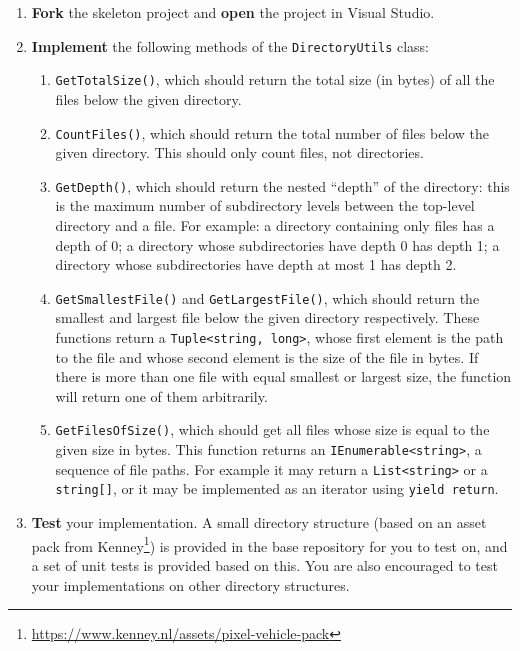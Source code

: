 \documentclass{../../../fal_assignment}
\begin{document}
\begin{enumerate}[label=(\alph*)]
	\item \textbf{Fork} the skeleton project and \textbf{open} the project in Visual Studio.
	\item \textbf{Implement} the following methods of the \lstinline{DirectoryUtils} class:
		\begin{enumerate}[label=(\roman*)]
			\item \lstinline{GetTotalSize()}, which should return the total size (in bytes) of all the files
				below the given directory.
			\item \lstinline{CountFiles()}, which should return the total number of files
				below the given directory. This should only count files, not directories.
			\item \lstinline{GetDepth()}, which should return the nested ``depth'' of the directory:
				this is the maximum number of subdirectory levels between the top-level directory
				and a file.
				For example: a directory containing only files has a depth of 0;
				a directory whose subdirectories have depth 0 has depth 1;
				a directory whose subdirectories have depth at most 1 has depth 2.
			\item \lstinline{GetSmallestFile()} and \lstinline{GetLargestFile()},
				which should return the smallest and largest file below the given directory respectively.
				These functions return a \lstinline{Tuple<string, long>},
				whose first element is the path to the file
				and whose second element is the size of the file in bytes.
				If there is more than one file with equal smallest or largest size,
				the function will return one of them arbitrarily.
			\item \lstinline{GetFilesOfSize()}, which should get all files whose size is equal to the
				given size in bytes.
				This function returns an \lstinline{IEnumerable<string>}, a sequence of file paths.
				For example it may return a \lstinline{List<string>} or a \lstinline{string[]},
				or it may be implemented as an iterator using \lstinline{yield return}.
		\end{enumerate}
	\item \textbf{Test} your implementation.
		A small directory structure (based on an asset pack from Kenney\footnote{\url{https://www.kenney.nl/assets/pixel-vehicle-pack}}) is provided in the base repository for you to test on, and a set of unit tests
		is provided based on this. You are also encouraged to test your implementations on other
		directory structures.
\end{enumerate}
\end{document}
